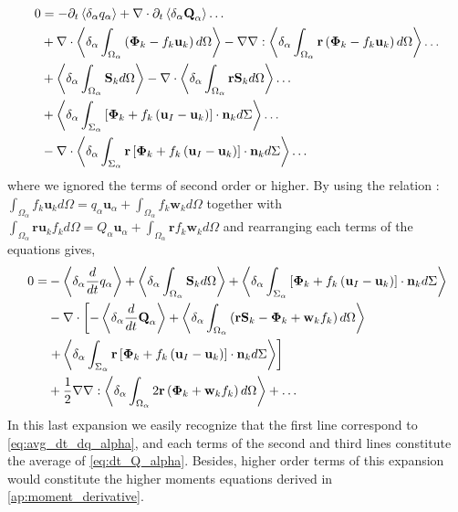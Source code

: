 \begin{align}    
    0 &= 
    - \partial_t \left<\delta_\alpha q_\alpha\right> +  \mathbf{\nabla} \cdot  \partial_t\left<\delta_\alpha \textbf{Q}_\alpha\right> \ldots\nonumber\\
    &+ \mathbf{\nabla} \cdot \left<\delta_\alpha \int_{\Omega_\alpha}\left(\mathbf{\Phi}_k - f_k \textbf{u}_k \right)d\Omega\right>
    -\mathbf{\nabla}\mathbf{\nabla} : \left<\delta_\alpha \int_{\Omega_\alpha}\textbf{r}\left(\mathbf{\Phi}_k - f_k \textbf{u}_k \right)d\Omega\right>
    \ldots\nonumber\\
    &+ \left<\delta_\alpha  \int_{\Omega_\alpha} \textbf{S}_k d\Omega\right>
    - \mathbf{\nabla} \cdot \left<\delta_\alpha  \int_{\Omega_\alpha} \textbf{r}\textbf{S}_k d\Omega\right>
    \ldots\nonumber\\
    &+ \left<\delta_\alpha \int_{\Sigma_\alpha}\left[
        \mathbf{\Phi}_k
        + f_k
        \left(
            \textbf{u}_I
            - \textbf{u}_k
        \right)
    \right]
    \cdot \textbf{n}_kd\Sigma\right> \ldots\nonumber\\
    &-  \mathbf{\nabla} \cdot \left<\delta_\alpha \int_{\Sigma_\alpha} \textbf{r}\left[
        \mathbf{\Phi}_k
        + f_k
        \left(
            \textbf{u}_I
            - \textbf{u}_k
        \right)
    \right]
    \cdot \textbf{n}_kd\Sigma\right> \ldots
\end{align}
where we ignored the terms of second order or higher. 
By using the relation : $\int_{\Omega_\alpha} f_k \textbf{u}_k d\Omega = q_\alpha\textbf{u}_\alpha  + \int_{\Omega_\alpha} f_k \textbf{w}_k d\Omega$
together with $\int_{\Omega_\alpha} \textbf{r} \textbf{u}_k f_k d\Omega = Q_\alpha\textbf{u}_\alpha  + \int_{\Omega_\alpha}\textbf{r} f_k \textbf{w}_k d\Omega$ and  rearranging each terms of the equations gives,
\begin{align}    
    0 = 
    &- \left<\delta_\alpha \frac{d}{d t} q_\alpha\right>
    + \left<\delta_\alpha  \int_{\Omega_\alpha} \textbf{S}_k d\Omega\right>
    + \left<\delta_\alpha \int_{\Sigma_\alpha}\left[
        \mathbf{\Phi}_k
        + f_k
        \left(
            \textbf{u}_I
            - \textbf{u}_k
        \right)
    \right]
    \cdot \textbf{n}_kd\Sigma\right> \nonumber\\
    &-  \mathbf{\nabla} \cdot  \left[
        - \left<\delta_\alpha \frac{d}{d t} \textbf{Q}_\alpha\right> 
         + \left<\delta_\alpha  \int_{\Omega_\alpha} \left(
            \textbf{r}\textbf{S}_k - \mathbf{\Phi}_k + \textbf{w}_kf_k 
         \right)d\Omega\right>
    \right.
    \nonumber\\
    &\left. 
         + \left<\delta_\alpha \int_{\Sigma_\alpha} \textbf{r}\left[
        \mathbf{\Phi}_k
        + f_k
        \left(
            \textbf{u}_I
            - \textbf{u}_k
        \right)
        \right]
        \cdot \textbf{n}_kd\Sigma\right> 
    \right]\nonumber\\
    &+  \frac{1}{2}\mathbf{\nabla}\mathbf{\nabla} :
         \left<\delta_\alpha  \int_{\Omega_\alpha} 2\textbf{r}\left(\mathbf{\Phi}_k + \textbf{w}_kf_k 
         \right)d\Omega\right>
         + \ldots
    \label{eq:expansion_final}
\end{align}
In this last expansion we easily recognize that the first line correspond to \ref{eq:avg_dt_dq_alpha}, and each terms of the second and third lines constitute the average of \ref{eq:dt_Q_alpha}. 
Besides, higher order terms of this expansion would constitute the higher moments equations derived in \ref{ap:moment_derivative}. 

